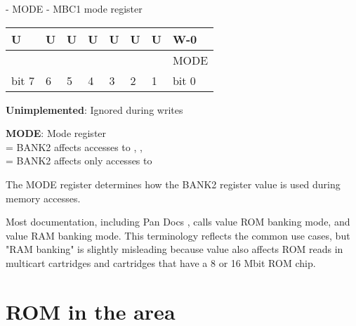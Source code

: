 \documentclass[\main/gbctr.tex]{subfiles}
\begin{document}
\begin{register}
  \caption{ - MODE - MBC1 mode register}

  {
    \ttfamily
    \begin{tabularx}{\linewidth}{|X|X|X|X|X|X|X|X|}
      \hline
      U                     & U                     & U                     & U                           & U & U & U & W-0   \\
      \hline
      \cellcolor{LightGray} & \cellcolor{LightGray} & \cellcolor{LightGray} & \cellcolor{LightGray} & \cellcolor{LightGray} & \cellcolor{LightGray} & \cellcolor{LightGray} & MODE \\
      \hline
      bit 7                 & 6                     & 5                     & 4                              & 3   & 2   & 1   & bit 0 \\
      \hline
    \end{tabularx}{\parfillskip=0pt\par}
  }

  \begin{description}[leftmargin=5em, style=nextline]
    \item[bit 7-1]
      \textbf{Unimplemented}: Ignored during writes
    \item[bit 0]
      \textbf{MODE}: Mode register\\
      = BANK2 affects accesses to , , \\
      = BANK2 affects only accesses to 
  \end{description}
\end{register}

The MODE register determines how the BANK2 register value is used during memory
accesses.

\begin{warning}
  Most documentation, including Pan Docs \cite{pandocs}, calls value 
  ROM banking mode, and value  RAM banking mode. This terminology
  reflects the common use cases, but "RAM banking" is slightly misleading because
  value  also affects ROM reads in multicart cartridges and cartridges
  that have a 8 or 16 Mbit ROM chip.
\end{warning}

\section{ROM in the  area}
\end{document}
